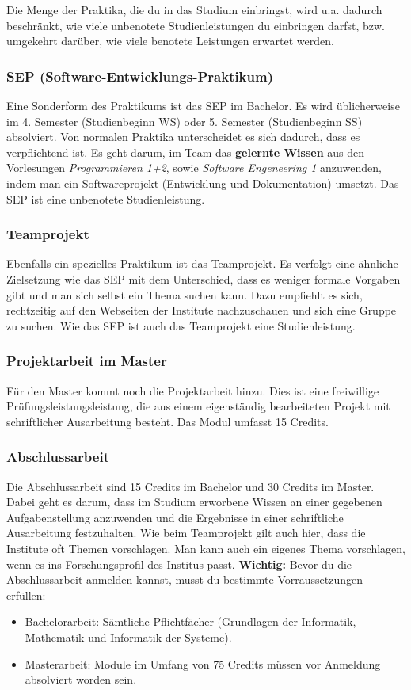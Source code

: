 \noindent	Die Menge der Praktika, die du in das Studium einbringst, wird u.a. dadurch beschränkt, wie viele unbenotete Studienleistungen du einbringen darfst, bzw. umgekehrt darüber, wie viele benotete Leistungen erwartet werden.

	\subsubsection*{SEP (Software-Entwicklungs-Praktikum)}
	Eine Sonderform des Praktikums ist das SEP im Bachelor. Es wird üblicherweise im 4. Semester (Studienbeginn WS) oder 5. Semester (Studienbeginn SS) absolviert. Von normalen Praktika unterscheidet es sich dadurch, dass es verpflichtend ist. Es geht darum, im Team das \textbf{gelernte Wissen} aus den Vorlesungen \emph{Programmieren 1+2}, sowie \emph{Software Engeneering 1} anzuwenden, indem man ein Softwareprojekt (Entwicklung und Dokumentation) umsetzt. Das SEP ist eine unbenotete Studienleistung.

	\subsubsection*{Teamprojekt}
	Ebenfalls ein spezielles Praktikum ist das Teamprojekt. Es verfolgt eine ähnliche Zielsetzung wie das SEP mit dem Unterschied, dass es weniger formale Vorgaben gibt und man sich selbst ein Thema suchen kann. Dazu empfiehlt es sich, rechtzeitig auf den Webseiten der Institute nachzuschauen und sich eine Gruppe zu suchen. Wie das SEP ist auch das Teamprojekt eine Studienleistung.

	\subsubsection{Projektarbeit im Master}
	Für den Master kommt noch die Projektarbeit hinzu. Dies ist eine
	freiwillige Prüfungsleistungsleistung, die aus einem eigenständig
	bearbeiteten Projekt mit schriftlicher Ausarbeitung besteht. Das Modul umfasst 15 Credits.

	\subsubsection{Abschlussarbeit}
	Die Abschlussarbeit sind 15 Credits im Bachelor und 30 Credits im Master. Dabei geht es darum, dass im Studium erworbene Wissen an einer gegebenen Aufgabenstellung anzuwenden und  die Ergebnisse in einer schriftliche Ausarbeitung festzuhalten. Wie beim Teamprojekt gilt auch hier, dass die Institute oft Themen vorschlagen.  Man kann auch ein eigenes Thema vorschlagen, wenn es ins Forschungsprofil des Institus passt. \textbf{Wichtig:} Bevor du die Abschlussarbeit anmelden kannst, musst du bestimmte Vorraussetzungen erfüllen:
	\begin{itemize}
		\item Bachelorarbeit: Sämtliche Pflichtfächer (Grundlagen der Informatik, Mathematik und Informatik der Systeme).
		\item Masterarbeit: Module im Umfang von 75 Credits müssen vor Anmeldung absolviert worden sein.
	\end{itemize}

